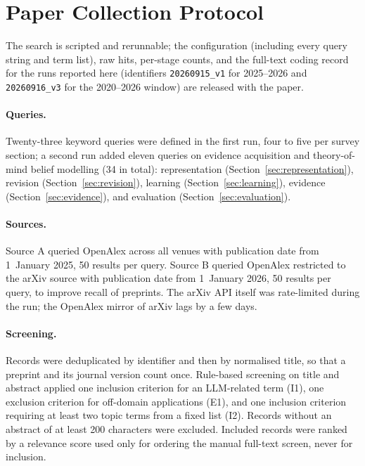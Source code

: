 \section{Paper Collection Protocol}
\label{app:method}

The search is scripted and rerunnable; the configuration (including every query string and term list), raw hits, per-stage counts, and the full-text coding record for the runs reported here (identifiers \texttt{20260915\_v1} for 2025--2026 and \texttt{20260916\_v3} for the 2020--2026 window) are released with the paper.

\paragraph{Queries.}
Twenty-three keyword queries were defined in the first run, four to five per survey section; a second run added eleven queries on evidence acquisition and theory-of-mind belief modelling (34 in total): representation (Section~\ref{sec:representation}), revision (Section~\ref{sec:revision}), learning (Section~\ref{sec:learning}), evidence (Section~\ref{sec:evidence}), and evaluation (Section~\ref{sec:evaluation}).

\paragraph{Sources.}
Source A queried OpenAlex across all venues with publication date from 1~January 2025, 50 results per query. Source B queried OpenAlex restricted to the arXiv source with publication date from 1~January 2026, 50 results per query, to improve recall of preprints. The arXiv API itself was rate-limited during the run; the OpenAlex mirror of arXiv lags by a few days.

\paragraph{Screening.}
Records were deduplicated by identifier and then by normalised title, so that a preprint and its journal version count once. Rule-based screening on title and abstract applied one inclusion criterion for an LLM-related term (I1), one exclusion criterion for off-domain applications (E1), and one inclusion criterion requiring at least two topic terms from a fixed list (I2). Records without an abstract of at least 200 characters were excluded. Included records were ranked by a relevance score used only for ordering the manual full-text screen, never for inclusion.


